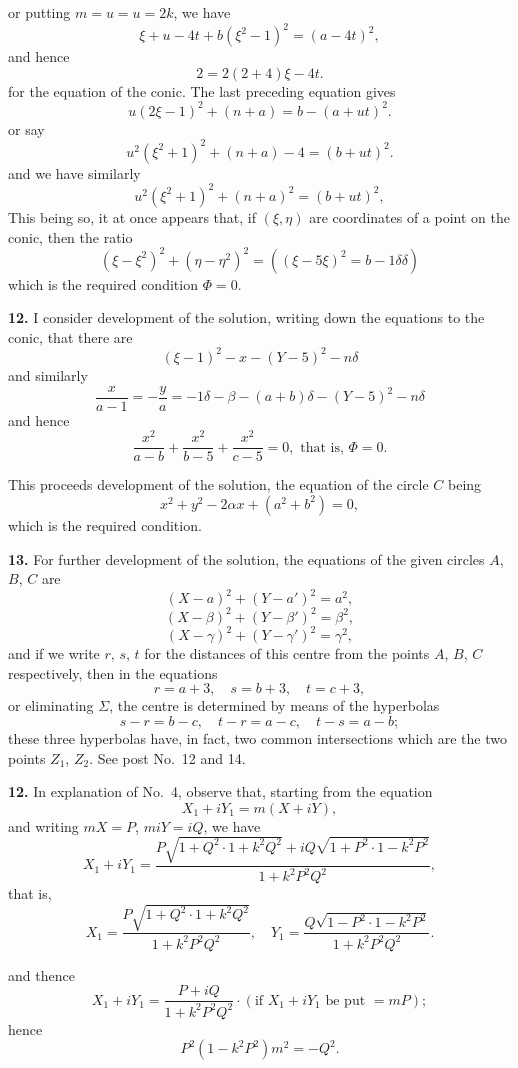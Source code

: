 \documentclass[11pt,a4paper]{book}
\begin{document}
or putting $m = u = u = 2k$, we have
\[
\xi + u - 4t + b(\xi^2 - 1)^2 = (a - 4t)^2,
\]
and hence
\[
2 = 2(2 + 4)\xi - 4t.
\]
for the equation of the conic. The last preceding equation gives
\[
u(2\xi - 1)^2 + (n + a) = b - (a + ut)^2.
\]
or say
\[
u^2(\xi^2 + 1)^2 + (n + a) - 4 = (b + ut)^2.
\]
and we have similarly
\[
u^2(\xi^2 + 1)^2 + (n + a)^2 = (b + ut)^2,
\]
This being so, it at once appears that, if $(\xi, \eta)$ are coordinates of a point on the conic, then the ratio
\[
(\xi - \xi^2)^2 + (\eta - \eta^2)^2 = ((\xi - 5\xi)^2 = b - 1\delta\delta)
\]
which is the required condition $\Phi = 0$.

\textbf{12.} I consider development of the solution, writing down the equations to the conic, that there are
\[
(\xi - 1)^2 - x - (Y - 5)^2 - n\delta
\]
and similarly
\[
\frac{x}{a - 1} = - \frac{y}{a} = -1\delta - \beta - (a + b)\delta - (Y - 5)^2 - n\delta
\]
and hence
\[
\frac{x^2}{a - b} + \frac{x^2}{b - 5} + \frac{x^2}{c - 5} = 0, \text{ that is, } \Phi = 0.
\]

This proceeds development of the solution, the equation of the circle $C$ being
\[
x^2 + y^2 - 2\alpha x + (a^2 + b^2) = 0,
\]
which is the required condition.

\textbf{13.} For further development of the solution, the equations of the given circles $A$, $B$, $C$ are
\[
(X - a)^2 + (Y - a')^2 = a^2,
\]
\[
(X - \beta)^2 + (Y - \beta')^2 = \beta^2,
\]
\[
(X - \gamma)^2 + (Y - \gamma')^2 = \gamma^2,
\]
and if we write $r$, $s$, $t$ for the distances of this centre from the points $A$, $B$, $C$ respectively, then in the equations
\[
r = a + 3, \quad s = b + 3, \quad t = c + 3,
\]
or eliminating $\Sigma$, the centre is determined by means of the hyperbolas
\[
s - r = b - c, \quad t - r = a - c, \quad t - s = a - b;
\]
these three hyperbolas have, in fact, two common intersections which are the two points $Z_1$, $Z_2$. See post No.\ 12 and 14.

\textbf{12.} In explanation of No.\ 4, observe that, starting from the equation
\[
X_1 + iY_1 = m(X + iY),
\]
and writing $m X = P$, $m i Y = iQ$, we have
\[
X_1 + iY_1 = \frac{P\sqrt{1 + Q^2 \cdot 1 + k^2 Q^2} + iQ\sqrt{1 + P^2 \cdot 1 - k^2 P^2}}{1 + k^2 P^2 Q^2},
\]
that is,
\[
X_1 = \frac{P \sqrt{1 + Q^2 \cdot 1 + k^2 Q^2}}{1 + k^2 P^2 Q^2}, \quad Y_1 = \frac{Q \sqrt{1 - P^2 \cdot 1 - k^2 P^2}}{1 + k^2 P^2 Q^2}.
\]

and thence
\[
X_1 + iY_1 = \frac{P + iQ}{1 + k^2 P^2 Q^2} \cdot (\text{if } X_1 + iY_1 \text{ be put } = mP);
\]
hence
\[
P^2 (1 - k^2 P^2) m^2 = -Q^2.
\]
\end{document}
